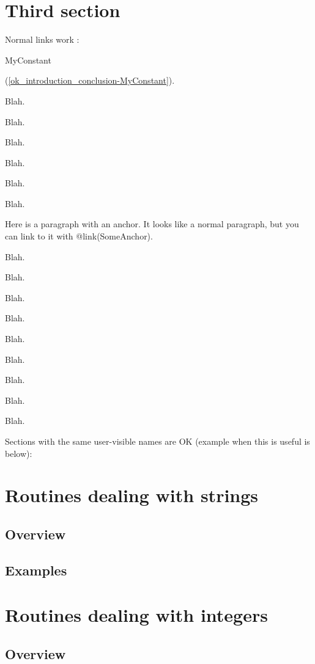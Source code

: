 \documentclass{report}
\begin{document}
\section{Third section}


Normal links work : \begin{ttfamily}MyConstant\end{ttfamily}(\ref{ok_introduction_conclusion-MyConstant}).

Blah.

Blah.

Blah.

Blah.

Blah.

Blah.

 Here is a paragraph with an anchor. It looks like a normal paragraph, but you can link to it with @link(SomeAnchor).

Blah.

Blah.

Blah.

Blah.

Blah.

Blah.

Blah.

Blah.

Blah.

Sections with the same user{-}visible names are OK (example when this is useful is below):

\section{Routines dealing with strings}


\subsection*{Overview}


\subsection*{Examples}


\section{Routines dealing with integers}


\subsection*{Overview}
\end{document}
